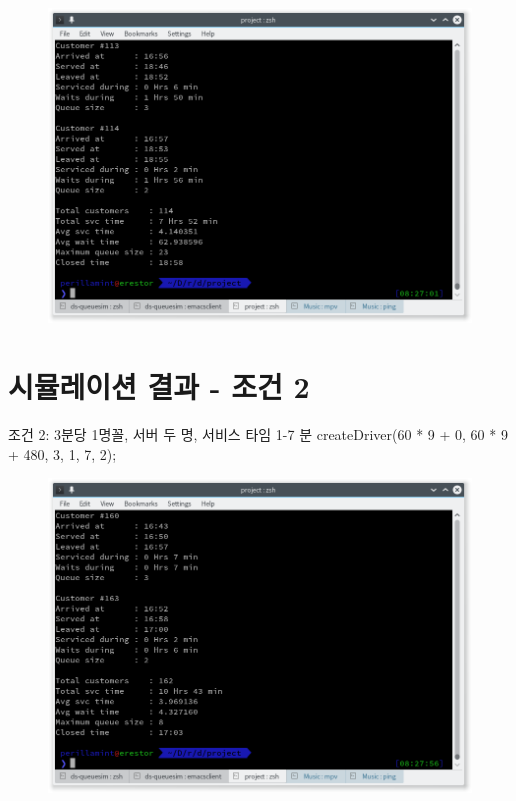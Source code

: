 \documentclass {article}
\begin{document}
{{\begin {figure}[h!]
  \centering
  \includegraphics [width=120mm]{queuesim2.png}
  \caption {}
  \label{fig:dmesg}
\end {figure}

\newpage
\section {시뮬레이션 결과 - 조건 2}
조건 2: 3분당 1명꼴, 서버 두 명, 서비스 타임 1-7 분\newline
createDriver(60 * 9 + 0, 60 * 9 + 480, 3, 1, 7, 2);

\begin {figure}[h]
  \centering
  \includegraphics [width=120mm]{queuesim3.png}
  \caption {}
  \label{fig:dmesg}
\end {figure}

}}
\end{document}
